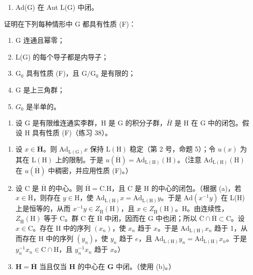 \begin{enumerate}
\def\labelenumi{(\Alph{enumi})}
\setcounter{enumi}{5}
\tightlist
\item
  Ad(G) 在 Aut L(G) 中闭。
\end{enumerate}

证明在下列每种情形中 G 都具有性质 (F)：

\begin{enumerate}
\def\labelenumi{(\roman{enumi})}
\item
  G 连通且幂零；
\item
  L(G) 的每个导子都是内导子；
\item
  \(\mathrm{G}_0\) 具有性质 (F)，且 \(\mathrm{G} / \mathrm{G}_0\) 是有限的；
\item
  G 是上三角群；
\item
  \(G_{0}\) 是半单的。
\end{enumerate}

\begin{enumerate}
\def\labelenumi{\arabic{enumi}.}
\setcounter{enumi}{38}
\tightlist
\item
  设 G 是有限维连通实李群，H 是 G 的积分子群，\(\bar{H}\) 是 H 在 G 中的闭包。假设 H 具有性质 (F)（练习 38）。
\end{enumerate}

\begin{enumerate}
\def\labelenumi{(\alph{enumi})}
\item
  设 \(x \in \overline{\mathbf{H}}\)。则 \(\mathrm{Ad}_{\mathrm{L(G)}}x\) 保持 \(\mathrm{L(H)}\) 稳定（第 2 号，命题 5）；令 \(u(x)\) 为其在 \(\mathrm{L(H)}\) 上的限制。于是 \(u(\overline{\mathrm{H}}) = \mathrm{Ad}_{\mathrm{L(H)}}(\mathrm{H})\)。（注意 \(\mathrm{Ad}_{\mathrm{L(H)}}(\mathrm{H})\) 在 \(u(\overline{\mathrm{H}})\) 中稠密，并应用性质 (F)。）
\item
  设 C 是 \(\overline{\mathrm{H}}\) 的中心。则 \(\overline{\mathrm{H}} = \mathrm{C.H}\)，且 C 是 H 的中心的闭包。（根据 (a)，若 \(x \in \overline{\mathrm{H}}\)，则存在 \(y \in \mathrm{H}\)，使 \(\mathrm{Ad}_{\mathrm{L(H)}} x = \mathrm{Ad}_{\mathrm{L(H)}} y\)。于是 \(\mathrm{Ad}(x^{-1}y)\) 在 L(H) 上是恒等的，从而 \(x^{-1}y \in Z_{\overline{\mathrm{H}}}(\mathrm{H})\)，且 \(x \in Z_{\overline{\mathrm{H}}}(\mathrm{H})\)。H。由连续性，\(Z_{\overline{\mathrm{H}}}(\mathrm{H})\) 等于 C。群 C 在 \(\overline{\mathrm{H}}\) 中闭，因而在 G 中也闭；所以 \(\overline{\mathrm{C}} \cap \overline{\mathrm{H}} \subset \mathrm{C}\)。设 \(x \in \mathrm{C}\)。存在 H 中的序列 \((x_n)\)，使 \(x_n\) 趋于 \(x\)。于是 \(\mathrm{Ad}_{\mathrm{L(H)}} x_n\) 趋于 1，从而存在 H 中的序列 \((y_n)\)，使 \(y_n\) 趋于 \(e\)，且 \(\mathrm{Ad}_{\mathrm{L(H)}} y_n = \mathrm{Ad}_{\mathrm{L(H)}} x_n\)。于是 \(y_n^{-1}x_n \in \mathrm{C} \cap \mathrm{H}\)，且 \(y_n^{-1}x_n\) 趋于 \(x\)。）
\item
  \(\mathbf{H} = \overline{\mathbf{H}}\) 当且仅当 \(\mathbf{H}\) 的中心在 \(\mathbf{G}\) 中闭。（使用 (b)。）
\end{enumerate}

